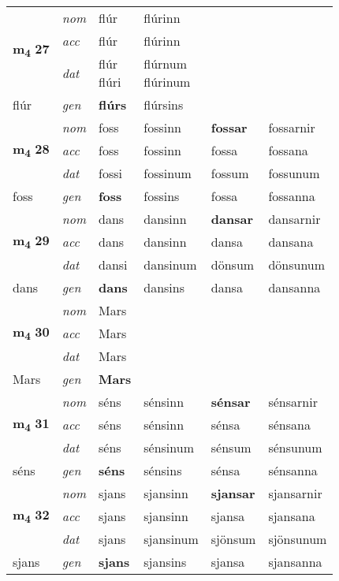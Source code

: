 \begin{longtable}[l]{X>{\footnotesize\itshape}XXXXX}
\multirow{3}{*}{{{\textbf{m{\textsubscript{4}}} \Large{\textbf{27}}}}} & nom & flúr & flúrinn & \textbf{} &  \\*
 & acc & flúr & flúrinn &  &  \\*
 & dat & \specialcell{flúr\\ flúri} & \specialcell{flúrnum\\ flúrinum} &  &  \\*
 {\footnotesize{flúr}} & gen & \textbf{flúrs} & flúrsins &  &  \\
\cmidrule{1-6}

\multirow{3}{*}{{{\textbf{m{\textsubscript{4}}} \Large{\textbf{28}}}}} & nom & foss & fossinn & \textbf{fossar} & fossarnir \\*
 & acc & foss & fossinn & fossa & fossana \\*
 & dat & fossi & fossinum & fossum & fossunum \\*
 {\footnotesize{foss}} & gen & \textbf{foss} & fossins & fossa & fossanna \\
\cmidrule{1-6}

\multirow{3}{*}{{{\textbf{m{\textsubscript{4}}} \Large{\textbf{29}}}}} & nom & dans & dansinn & \textbf{dansar} & dansarnir \\*
 & acc & dans & dansinn & dansa & dansana \\*
 & dat & dansi & dansinum & dönsum & dönsunum \\*
 {\footnotesize{dans}} & gen & \textbf{dans} & dansins & dansa & dansanna \\
\cmidrule{1-6}

\multirow{3}{*}{{{\textbf{m{\textsubscript{4}}} \Large{\textbf{30}}}}} & nom & Mars &  & \textbf{} &  \\*
 & acc & Mars &  &  &  \\*
 & dat & Mars &  &  &  \\*
 {\footnotesize{Mars}} & gen & \textbf{Mars} &  &  &  \\

\multirow{3}{*}{{{\textbf{m{\textsubscript{4}}} \Large{\textbf{31}}}}} & nom & séns & sénsinn & \textbf{sénsar} & sénsarnir \\*
 & acc & séns & sénsinn & sénsa & sénsana \\*
 & dat & séns & sénsinum & sénsum & sénsunum \\*
 {\footnotesize{séns}} & gen & \textbf{séns} & sénsins & sénsa & sénsanna \\
\cmidrule{1-6}

\multirow{3}{*}{{{\textbf{m{\textsubscript{4}}} \Large{\textbf{32}}}}} & nom & sjans & sjansinn & \textbf{sjansar} & sjansarnir \\*
 & acc & sjans & sjansinn & sjansa & sjansana \\*
 & dat & sjans & sjansinum & sjönsum & sjönsunum \\*
 {\footnotesize{sjans}} & gen & \textbf{sjans} & sjansins & sjansa & sjansanna \\
\cmidrule{1-6}


\end{longtable}
